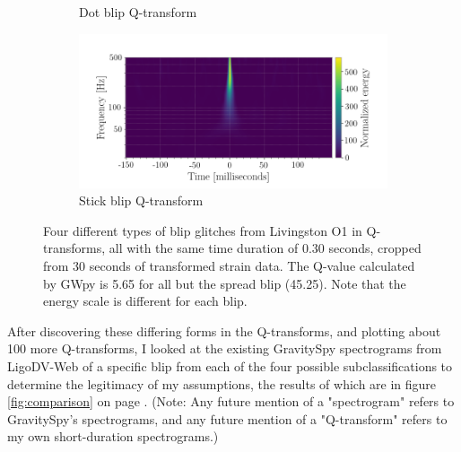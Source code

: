 \documentclass[a4paper]{article}
\begin{document}
\begin{figure}[h!]
\begin{subfigure}{.49\textwidth}
		\caption{Dot blip Q-transform}
		\label{fig:dot}
	\end{subfigure}
	\begin{subfigure}{.49\textwidth}
		\centering
		\includegraphics[width=1\linewidth]{stick_blip}
		\caption{Stick blip Q-transform}
		\label{fig:stick}
	\end{subfigure}
	\caption{Four different types of blip glitches from Livingston O1 in Q-transforms, all with the same time duration of 0.30 seconds, cropped from 30 seconds of transformed strain data. The Q-value calculated by GWpy is 5.65 for all but the spread blip (45.25). Note that the energy scale is different for each blip.}
	\label{fig:q_transforms}
\end{figure}

After discovering these differing forms in the Q-transforms, and plotting about 100 more Q-transforms, I looked at the existing GravitySpy spectrograms from LigoDV-Web of a specific blip from each of the four possible subclassifications to determine the legitimacy of my assumptions, the results of which are in figure \ref{fig:comparison} on page \pageref{fig:comparison}. (Note: Any future mention of a "spectrogram" refers to GravitySpy's spectrograms, and any future mention of a "Q-transform" refers to my own short-duration spectrograms.)
\end{document}
